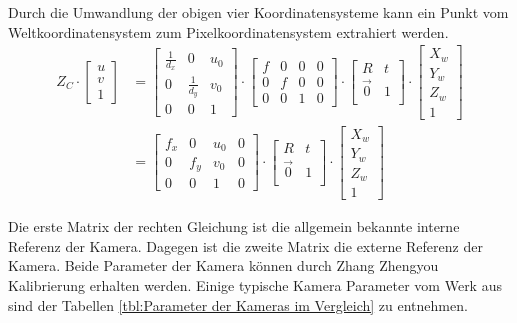 Durch die Umwandlung der obigen vier Koordinatensysteme kann ein Punkt vom Weltkoordinatensystem zum Pixelkoordinatensystem extrahiert werden.
\begin{equation}
\begin{split}
   Z_C \cdot \begin{bmatrix}
	u \\  
	v \\
	1
	\end{bmatrix} & = \begin{bmatrix}
	\frac{1}{d_x} 			& 0 			& u_0	\\
	0	 					& \frac{1}{d_y} & v_0	\\
	0     					& 0 			& 1	
	\end{bmatrix} \cdot \begin{bmatrix}
	f & 0 & 0 & 0	\\
	0 & f & 0 & 0	\\
	0 & 0 & 1 & 0	
	\end{bmatrix} \cdot \begin{bmatrix}
	R & t	\\
	\vec{0}	& 1 \\
	\end{bmatrix} \cdot \begin{bmatrix}
	X_w \\  
	Y_w \\
	Z_w \\
	1
	\end{bmatrix} \\
	& = \begin{bmatrix}
	f_x & 0 & u_0 & 0	\\
	0 & f_y & v_0 & 0	\\
	0 & 0 & 1 & 0	
	\end{bmatrix} \cdot \begin{bmatrix}
	R & t	\\
	\vec{0}	& 1 \\
	\end{bmatrix} \cdot \begin{bmatrix}
	X_w \\  
	Y_w \\
	Z_w \\
	1
	\end{bmatrix}
\end{split}	
\end{equation}

Die erste Matrix der rechten Gleichung ist die allgemein bekannte interne Referenz der Kamera. Dagegen ist die zweite Matrix die externe Referenz der Kamera. Beide Parameter der Kamera können durch Zhang Zhengyou \cite{zhangzhengyou} Kalibrierung erhalten werden. Einige typische Kamera Parameter vom Werk aus sind der Tabellen \ref{tbl:Parameter der Kameras im Vergleich} zu entnehmen.

